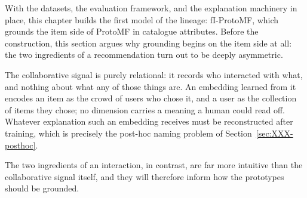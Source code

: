 

With the datasets, the evaluation framework, and the explanation machinery in
place, this chapter builds the first model of the lineage: fI-ProtoMF, which
grounds the item side of ProtoMF in catalogue attributes. Before the
construction, this section argues why grounding begins on the item side at
all: the two ingredients of a recommendation turn out to be deeply
asymmetric.


The collaborative signal is purely relational: it records who interacted
with what, and nothing about what any of those things are. An embedding
learned from it encodes an item as the crowd of users who chose it, and a
user as the collection of items they chose; no dimension carries a meaning a
human could read off. Whatever explanation such an embedding receives must
be reconstructed after training, which is precisely the post-hoc naming
problem of Section~\ref{sec:XXX-posthoc}.  %


The two ingredients of an interaction, in contrast, are far more intuitive
than the collaborative signal itself, and they will therefore inform how the
prototypes should be grounded.
